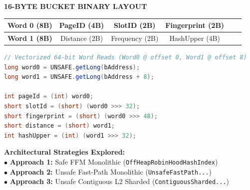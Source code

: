 \documentclass[12pt]{article}
\begin{document}
\hfill
\begin{minipage}[t]{0.48\textwidth}
    \vspace{0pt}
    {\fontsize{9}{11}\selectfont\color{shidenmuted}\textbf{16-BYTE BUCKET BINARY LAYOUT}\par}
    \vspace{1.5mm}
    
    \begin{center}
      \fontsize{7.5}{9.5}\selectfont
      \color{shidencyan}
      \begin{tabular}{|c|c|c|c|c|c|}
      \hline
      \textbf{Word 0 (8B)} & PageID (4B) & SlotID (2B) & Fingerprint (2B) \\
      \hline
      \textbf{Word 1 (8B)} & Distance (2B) & Frequency (2B) & HashUpper (4B) \\
      \hline
      \end{tabular}
    \end{center}
    
    \begin{lstlisting}[language=Java]
// Vectorized 64-bit Word Reads (Word0 @ offset 0, Word1 @ offset 8)
long word0 = UNSAFE.getLong(bAddress);
long word1 = UNSAFE.getLong(bAddress + 8);

int pageId = (int) word0;
short slotId = (short) (word0 >>> 32);
short fingerprint = (short) (word0 >>> 48);
short distance = (short) word1;
int hashUpper = (int) (word1 >>> 32);
    \end{lstlisting}
    
    \vspace{1mm}
    \fontsize{8.5}{10.5}\selectfont
    \noindent\textcolor{shidenaccent}{\textbf{Architectural Strategies Explored:}}\\
    \textcolor{shidenpurple}{$\bullet$ \textbf{Approach 1:}} Safe FFM Monolithic (\texttt{OffHeapRobinHoodHashIndex})\\
    \textcolor{shidenpurple}{$\bullet$ \textbf{Approach 2:}} Unsafe Fast-Path Monolithic (\texttt{UnsafeFastPath...})\\
    \textcolor{shidenpurple}{$\bullet$ \textbf{Approach 3:}} Unsafe Contiguous L2 Sharded (\texttt{ContiguousSharded...})
\end{minipage}
\clearpage
\end{document}
